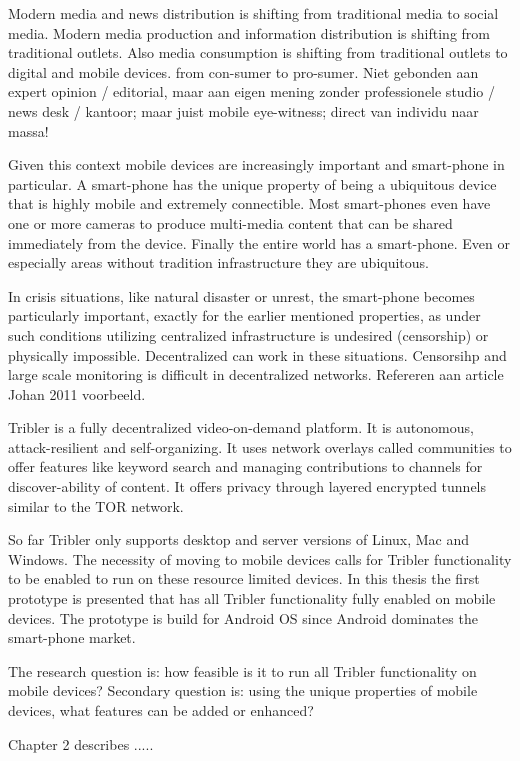 Modern media and news distribution is shifting from traditional media to social media.
Modern media production and information distribution is shifting from traditional outlets.
Also media consumption is shifting from traditional outlets to digital and mobile devices.
from con-sumer to pro-sumer.
Niet gebonden aan expert opinion / editorial, maar aan eigen mening zonder professionele studio / news desk / kantoor; maar juist mobile eye-witness; direct van individu naar massa!

Given this context mobile devices are increasingly important and smart-phone in particular.
A smart-phone has the unique property of being a ubiquitous device that is highly mobile and extremely connectible.
Most smart-phones even have one or more cameras to produce multi-media content that can be shared immediately from the device.
Finally the entire world has a smart-phone.
Even or especially areas without tradition infrastructure they are ubiquitous.

In crisis situations, like natural disaster or unrest, the smart-phone becomes particularly important, exactly for the earlier mentioned properties, as under such conditions utilizing centralized infrastructure is undesired (censorship) or physically impossible.
Decentralized can work in these situations.
Censorsihp and large scale monitoring is difficult in decentralized networks.
Refereren aan article Johan 2011 voorbeeld.


Tribler is a fully decentralized video-on-demand platform.
It is autonomous, attack-resilient and self-organizing.
It uses network overlays called communities to offer features like keyword search and managing contributions to channels for discover-ability of content.
It offers privacy through layered encrypted tunnels similar to the TOR network.

So far Tribler only supports desktop and server versions of Linux, Mac and Windows.
The necessity of moving to mobile devices calls for Tribler functionality to be enabled to run on these resource limited devices.
In this thesis the first prototype is presented that has all Tribler functionality fully enabled on mobile devices.
The prototype is build for Android OS since Android dominates the smart-phone market.

The research question is: how feasible is it to run all Tribler functionality on mobile devices? %
Secondary question is: using the unique properties of mobile devices, what features can be added or enhanced?

Chapter 2 describes .....